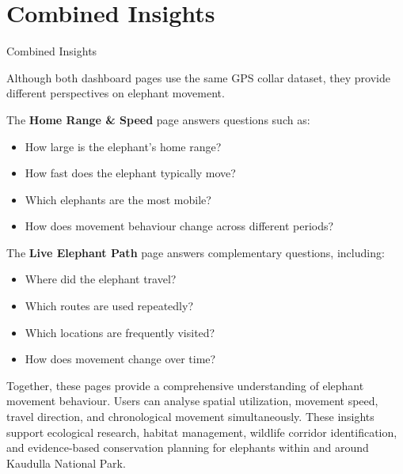 \documentclass{beamer}
\begin{document}
	
	
	\section{Combined Insights}
		\begin{frame}{Combined Insights}
		
		Although both dashboard pages use the same GPS collar dataset, they provide different perspectives on elephant movement.
		
		\vspace{0.5cm}
		
		The \textbf{Home Range \& Speed} page answers questions such as:
		
		\begin{itemize}
			\item How large is the elephant's home range?
			\item How fast does the elephant typically move?
			\item Which elephants are the most mobile?
			\item How does movement behaviour change across different periods?
		\end{itemize}
	\end{frame}
	
	
	
	
	
		\begin{frame}
		The \textbf{Live Elephant Path} page answers complementary questions, including:
		
		\begin{itemize}
			\item Where did the elephant travel?
			\item Which routes are used repeatedly?
			\item Which locations are frequently visited?
			\item How does movement change over time?
		\end{itemize}
		
		Together, these pages provide a comprehensive understanding of elephant movement behaviour. Users can analyse spatial utilization, movement speed, travel direction, and chronological movement simultaneously. These insights support ecological research, habitat management, wildlife corridor identification, and evidence-based conservation planning for elephants within and around Kaudulla National Park.
	\end{frame}
	
	
	
\end{document}
